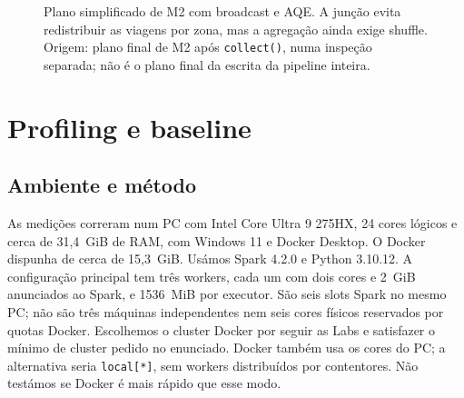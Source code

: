 \documentclass[sigconf]{acmart}
\begin{document}
\begin{figure}[t]
\centering
{}
\caption{Plano simplificado de M2 com broadcast e AQE. A junção evita
redistribuir as viagens por zona, mas a agregação ainda exige shuffle.
Origem: plano final de M2 após \texttt{collect()}, numa inspeção
separada; não é o plano final da escrita da pipeline inteira.}
\label{fig:plano}
\end{figure}

\section{Profiling e baseline}
\subsection{Ambiente e método}
As medições correram num PC com Intel Core Ultra 9 275HX, 24 cores
lógicos e cerca de 31,4~GiB de RAM, com Windows 11 e Docker Desktop.
O Docker dispunha de cerca de 15,3~GiB. Usámos Spark 4.2.0 e Python
3.10.12. A configuração principal tem três workers, cada um com
dois cores e 2~GiB anunciados ao Spark, e 1536~MiB por executor.
São seis slots Spark no mesmo PC; não são três máquinas independentes
nem seis cores físicos reservados por quotas Docker.
Escolhemos o cluster Docker por seguir as Labs e satisfazer o mínimo
de cluster pedido no enunciado. Docker também usa os cores do PC;
a alternativa seria \texttt{local[*]}, sem workers distribuídos por
contentores. Não testámos se Docker é mais rápido que esse modo.
\end{document}
